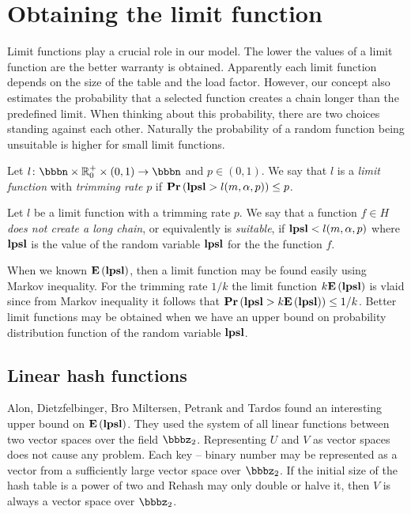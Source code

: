 \section{Obtaining the limit function}
\label{section-limit}
Limit functions play a crucial role in our model. The lower the values of a limit function are the better warranty is obtained. Apparently each limit function depends on the size of the table and the load factor. However, our concept also estimates the probability that a selected function creates a chain longer than the predefined limit. When thinking about this probability, there are two choices standing against each other. Naturally the probability of a random function being unsuitable is higher for small limit functions.

\begin{definition}
\label{definition-limit-function}
Let $l\colon \bbbn \times \mathbb{R}_0^+ \times (0, 1) \rightarrow \bbbn$ and $p \in (0, 1)$.  We say that $l$ is a \emph{limit function} with \emph{trimming rate} $p$ if $\mathbf{Pr}\left(\mathbf{lpsl} > l(m, \alpha, p)\right) \leq p$.

Let $l$ be a limit function with a trimming rate $p$. We say that a function $f \in H$ \emph{does not create a long chain}, or equivalently is \emph{suitable}, if $\mathbf{lpsl} < l(m, \alpha, p)$ where $\mathbf{lpsl}$ is the value of the random variable $\mathbf{lpsl}$ for the the function $f$.
\end{definition}

When we known $\mathbf{E}\left(\mathbf{lpsl}\right)$, then a limit function may be found easily using Markov inequality. For the trimming rate $1/k$ the limit function $k \mathbf{E}\left(\mathbf{lpsl}\right)$ is vlaid since from Markov inequality it follows that $\mathbf{Pr}\left(\mathbf{lpsl} > k \mathbf{E}\left(\mathbf{lpsl}\right)\right) \leq {1}/{k}$. Better limit functions may be obtained when we have an upper bound on probability distribution function of the random variable $\mathbf{lpsl}$.

\subsection{Linear hash functions}
Alon, Dietzfelbinger, Bro Miltersen, Petrank and Tardos \cite{DBLP:journals/jacm/AlonDMPT99} found an interesting upper bound on $\mathbf{E}\left(\mathbf{lpsl}\right)$. They used the system of all linear functions between two vector spaces over the field $\bbbz_2$. Representing $U$ and $V$ as vector spaces does not cause any problem. Each key -- binary number may be represented as a vector from a sufficiently large vector space over $\bbbz_2$. If the initial size of the hash table is a power of two and Rehash may only double or halve it, then $V$ is always a vector space over $\bbbz_2$.

